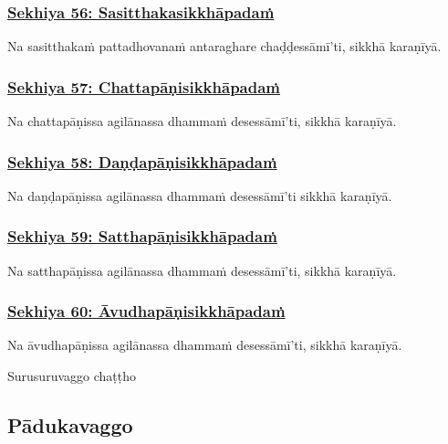 \subsubsection*{\hyperref[training56]{Sekhiya 56: Sasitthakasikkhāpadaṁ}}
\label{sekh56}

Na sasitthakaṁ pattadhovanaṁ antaraghare chaḍḍessāmī'ti, sikkhā karaṇīyā.



\subsubsection*{\hyperref[training57]{Sekhiya 57: Chattapāṇisikkhāpadaṁ}}
\label{sekh57}

Na chattapāṇissa agilānassa dhammaṁ desessāmī'ti, sikkhā karaṇīyā.



\subsubsection*{\hyperref[training58]{Sekhiya 58: Daṇḍapāṇisikkhāpadaṁ}}
\label{sekh58}

Na daṇḍapāṇissa agilānassa dhammaṁ desessāmī'ti sikkhā karaṇīyā.



\subsubsection*{\hyperref[training59]{Sekhiya 59: Satthapāṇisikkhāpadaṁ}}
\label{sekh59}

Na satthapāṇissa agilānassa dhammaṁ desessāmī'ti, sikkhā karaṇīyā.



\subsubsection*{\hyperref[training60]{Sekhiya 60: Āvudhapāṇisikkhāpadaṁ}}
\label{sekh60}

Na āvudhapāṇissa agilānassa dhammaṁ desessāmī'ti, sikkhā karaṇīyā.

\begin{center}
	Surusuruvaggo chaṭṭho
\end{center}



\subsection{Pādukavaggo}

